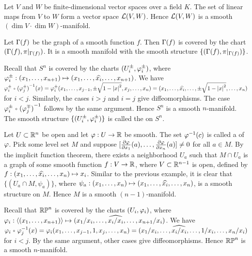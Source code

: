 \documentclass[10pt]{article}
\begin{document}
\begin{example}
    Let $V$ and $W$ be finite-dimensional vector spaces over a field $K$. The set of linear maps from $V$ to $W$ form a vector space $\mathcal{L}(V,W)$. Hence $\mathcal{L}(V,W)$ is a smooth $(\dim V\cdot\dim W)$-manifold.
\end{example}
\begin{example}
    Let $\Gamma(f)$ be the graph of a smooth function $f$. Then $\Gamma(f)$ is covered by the chart $(\Gamma(f),\pi{|}_{\Gamma(f)})$. It is a smooth manifold with the smooth structure $\{(\Gamma(f),\pi{|}_{\Gamma(f)})\}$.
\end{example}
\begin{example}
    Recall that ${S}^{n}$ is covered by the charts $({U}_{i}^{\pm},{\varphi}_{i}^{\pm})$, where ${\varphi}_{i}^{\pm}:({x}_{1},\dots,{x}_{n+1})\mapsto({x}_{1},\dots,\widehat{{x}_{i}},\dots,{x}_{n+1})$. We have ${\vp}_{i}^{\pm}\comp{({\vp}_{j}^{\pm})}^{-1}(x)={\vp}_{i}^{\pm}({x}_{1},\dots,{x}_{j-1},\pm\sqrt{1-{|x|}^{2}},{x}_{j},\dots,{x}_{n})=({x}_{1},\dots,\wh{{x}_{i}},\dots,\pm\sqrt{1-{|x|}^{2}},\dots,{x}_{n})$ for $i<j$. Similarly, the cases $i>j$ and $i=j$ give diffeomorphisms. The case ${\vp}_{i}^{\pm}\comp{({\vp}_{j}^{\mp})}^{-1}$ follows by the same argument. Hence ${S}^{n}$ is a smooth $n$-manifold. The smooth structure $\{({U}_{i}^{\pm},{\varphi}_{i}^{\pm})\}$ is called the  on ${S}^{n}$.
\end{example}
\begin{example}
    Let $U\subset{\mathbb{R}}^{n}$ be open and let $\varphi:U\to\mathbb{R}$ be smooth. The set ${\varphi}^{-1}(c)$ is called a  of $\varphi$. Pick some level set $M$ and suppose $[\frac{\partial\varphi}{\partial{x}_{1}}(a),\dots,\frac{\partial\varphi}{\partial{x}_{n}}(a)]\ne 0$ for all $a\in M$. By the implicit function theorem, there exists a neighborhood ${U}_{a}$ such that $M\cap{U}_{a}$ is a graph of some smooth function $f:V\to\mathbb{R}$, where $V\subset{\mathbb{R}}^{n-1}$ is open, defined by $f:({x}_{1},\dots,\widehat{{x}_{i}},\dots,{x}_{n})\mapsto{x}_{i}$. Similar to the previous example, it is clear that $\{({U}_{a}\cap M,{\psi}_{a})\}$, where ${\psi}_{a}:({x}_{1},\dots,{x}_{n})\mapsto({x}_{1},\dots,\widehat{{x}_{i}},\dots,{x}_{n})$, is a smooth structure on $M$. Hence $M$ is a smooth $(n-1)$-manifold.
\end{example}
\begin{example}
    Recall that ${\mathbb{RP}}^{n}$ is covered by the charts $({U}_{i},{\varphi}_{i})$, where ${\varphi}_{i}:\langle{({x}_{1},\dots,{x}_{n+1})}\rangle\mapsto({x}_{1}/{x}_{i},\dots,\widehat{{x}_{i}/{x}_{i}},\dots,\\{x}_{n+1}/{x}_{i})$. We have ${\vp}_{i}\comp{\vp}_{j}^{-1}(x)={\vp}_{i}({x}_{1},\dots,{x}_{j-1},1,{x}_{j},\dots,{x}_{n})=({x}_{1}/{x}_{i},\dots,\wh{{x}_{i}/{x}_{i}},\dots,1/{x}_{i},\dots,{x}_{n}/{x}_{i})$ for $i<j$. By the same argument, other cases give diffeomorphisms. Hence ${\mathbb{RP}}^{n}$ is a smooth $n$-manifold.
\end{example}
\end{document}
